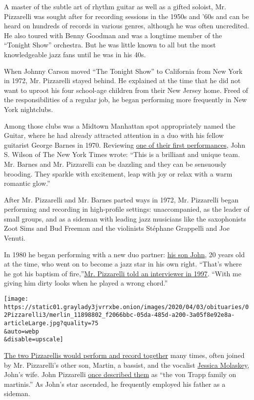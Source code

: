 A master of the subtle art of rhythm guitar as well as a gifted soloist,
Mr. Pizzarelli was sought after for recording sessions in the 1950s and
'60s and can be heard on hundreds of records in various genres, although
he was often uncredited. He also toured with Benny Goodman and was a
longtime member of the ``Tonight Show'' orchestra. But he was little
known to all but the most knowledgeable jazz fans until he was in his
40s.

When Johnny Carson moved ``The Tonight Show'' to California from New
York in 1972, Mr. Pizzarelli stayed behind. He explained at the time
that he did not want to uproot his four school-age children from their
New Jersey home. Freed of the responsibilities of a regular job, he
began performing more frequently in New York nightclubs.

Among those clubs was a Midtown Manhattan spot appropriately named the
Guitar, where he had already attracted attention in a duo with his
fellow guitarist George Barnes in 1970. Reviewing
\href{https://www.nytimes3xbfgragh.onion/1970/10/09/archives/a-jazz-guitar-duo-shows-virtuosity-bucky-pizzarelli-becomes-partner.html}{one
of their first performances}, John S. Wilson of The New York Times
wrote: ``This is a brilliant and unique team. Mr. Barnes and Mr.
Pizzarelli can be dazzling and they can be sensuously brooding. They
sparkle with excitement, leap with joy or relax with a warm romantic
glow.''

After Mr. Pizzarelli and Mr. Barnes parted ways in 1972, Mr. Pizzarelli
began performing and recording in high-profile settings: unaccompanied,
as the leader of small groups, and as a sideman with leading jazz
musicians like the saxophonists Zoot Sims and Bud Freeman and the
violinists Stéphane Grappelli and Joe Venuti.

In 1980 he began performing with a new duo partner:
\href{http://www.johnpizzarelli.com/}{his son John}, 20 years old at the
time, who went on to become a jazz star in his own right. ``That's where
he got his baptism of
fire,''\href{https://www.youtube.com/watch?v=dtwdk8VTyx4\&t=2897s}{Mr.
Pizzarelli told an interviewer in 1997}. ``With me giving him dirty
looks when he played a wrong chord.''

\texttt{[image: https://static01.graylady3jvrrxbe.onion/images/2020/04/03/obituaries/02Pizzarelli3/merlin\_11898802\_f2066bbc-05da-485d-a200-3a05f8e92e8a-articleLarge.jpg?quality=75\\\&auto=webp\\\&disable=upscale]}

\href{https://www.youtube.com/watch?v=36UBSUodBeg}{The two Pizzarellis
would perform and record together} many times, often joined by Mr.
Pizzarelli's other son, Martin, a bassist, and the vocalist
\href{http://www.jessicamolaskey.com/}{Jessica Molaskey}, John's wife.
John Pizzarelli
\href{https://www.nytimes3xbfgragh.onion/2004/06/08/arts/the-family-that-plays-together-has-an-improbably-good-time.html}{once
described them} as ``the von Trapp family on martinis.'' As John's star
ascended, he frequently employed his father as a sideman.

